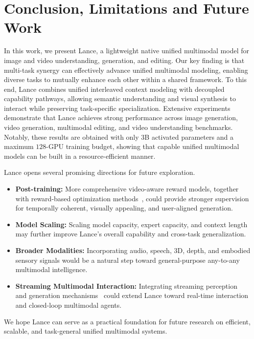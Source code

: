 
\section{Conclusion, Limitations and Future Work}
\label{sec:Conclusion}

In this work, we present Lance, a lightweight native unified multimodal model for image and video understanding, generation, and editing. Our key finding is that multi-task synergy can effectively advance unified multimodal modeling, enabling diverse tasks to mutually enhance each other within a shared framework. To this end, Lance combines unified interleaved context modeling with decoupled capability pathways, allowing semantic understanding and visual synthesis to interact while preserving task-specific specialization. Extensive experiments demonstrate that Lance achieves strong performance across image generation, video generation, multimodal editing, and video understanding benchmarks. Notably, these results are obtained with only $3$B activated parameters and a maximum $128$-GPU training budget, showing that capable unified multimodal models can be built in a resource-efficient manner.

Lance opens several promising directions for future exploration. 
\begin{itemize}
    \item \textbf{Post-training:} More comprehensive video-aware reward models, together with reward-based optimization methods~\cite{liu2026flow,xue2025dancegrpo,zheng2025diffusionnft}, could provide stronger supervision for temporally coherent, visually appealing, and user-aligned generation.

    \item \textbf{Model Scaling:} Scaling model capacity, expert capacity, and context length may further improve Lance's overall capability and cross-task generalization.

    \item \textbf{Broader Modalities:} Incorporating audio, speech, 3D, depth, and embodied sensory signals would be a natural step toward general-purpose any-to-any multimodal intelligence.

    \item \textbf{Streaming Multimodal Interaction:}  Integrating streaming perception and generation mechanisms~\cite{huang2026self,wu2026stream,tu2026stream} could extend Lance toward real-time interaction and closed-loop multimodal agents.
\end{itemize}

We hope Lance can serve as a practical foundation for future research on efficient, scalable, and task-general unified multimodal systems.